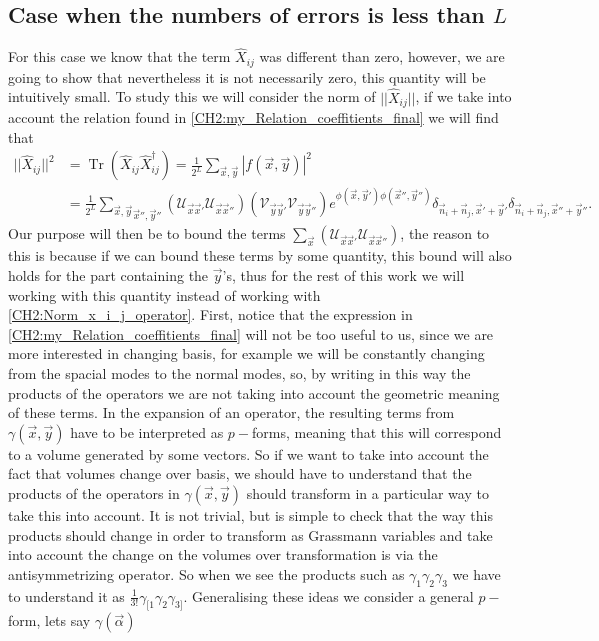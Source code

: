\subsection{Case when the numbers of errors is less than $L$}
For this case we know that the term $\hat{X}_{ij}$ was different than zero, however, we are going to show that nevertheless it is not necessarily zero, this quantity will be intuitively small. To study this we will consider the norm of $||\hat{X}_{ij}||$, if we take into account the relation found in \eqref{CH2:my_Relation_coeffitients_final} we will find that
\begin{equation}
\begin{aligned}
||\hat{X}_{ij}||^{2}&=\operatorname{Tr}\left(\hat{X}_{ij} \hat{X}^{\dagger}_{ij}\right) = \frac{1}{2^L}\sum_{\vec{x},\vec{y}}|f(\vec{x},\vec{y})|^2\\
&=\frac{1}{2^L}\underset{\vec{x}'',\vec{y}''}{\sum_{\vec{x},\vec{y}}}\left(	\mathcal{U}_{\vec{x}\vec{x}'} \mathcal{U}_{\vec{x}\vec{x}''}\right) \left(	\mathcal{V}_{\vec{y}\vec{y}'} \mathcal{V}_{\vec{y}\vec{y}''}\right) e^{\phi(\vec{x},\vec{y}')\phi(\vec{x}'',\vec{y}'')}\delta_{\vec{n}_i+\vec{n}_j,\vec{x}'+\vec{y}'}\delta_{\vec{n}_i+\vec{n}_j,\vec{x}''+\vec{y}''}.
\end{aligned}
\label{CH2:Norm_x_i_j_operator}
\end{equation}
\indent Our purpose will then be to bound the terms $\sum_{\vec{x}}\left(	\mathcal{U}_{\vec{x}\vec{x}'} \mathcal{U}_{\vec{x}\vec{x}''}\right)$, the reason to this is because if we can bound these terms by some quantity, this bound will also holds for the part containing the $\vec{y}$'s, thus for the rest of this work we will working with this quantity instead of working with \eqref{CH2:Norm_x_i_j_operator}. First, notice that the expression in \eqref{CH2:my_Relation_coeffitients_final} will not be too useful to us, since we are more interested in changing basis, for example we will be constantly changing from the spacial modes to the normal modes, so, by writing in this way the products of the operators we are not taking into account the geometric meaning of these terms. In the expansion of an operator, the resulting terms from $\gamma(\vec{x},\vec{y})$ have to be interpreted as $p-$forms, meaning that this will correspond to a volume generated by some vectors. So if we want to take into account the fact that volumes change over basis, we should have to understand that the products of the operators in $\gamma(\vec{x},\vec{y})$ should transform in a particular way to take this into account. It is not trivial, but is simple to check that the way this products should change in order to transform as Grassmann variables and take into account the change on the volumes over transformation is via the antisymmetrizing operator. So when we see the products such as $\gamma_{1}\gamma_{2}\gamma_{3}$ we have to understand it as $\frac{1}{3!}\gamma_{[1}\gamma_2\gamma_{3]}$. Generalising these ideas we consider a general $p-$form, lets say $\gamma(\vec{\alpha})$
